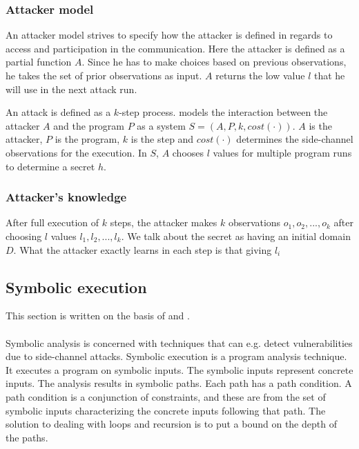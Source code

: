 \documentclass[11pt,a4paper,notitlepage]{article}
\begin{document}
\subsubsection{Attacker model}

An attacker model strives to specify how the attacker is defined in regards to access and participation in the communication. Here the attacker is defined as a partial function $A$. Since he has to make choices based on previous observations, he takes the set of prior observations as input. $A$ returns the low value $l$ that he will use in the next attack run. 

An attack is defined as a $k$-step process. \cite{phan2017synthesis} models the interaction between the attacker $A$ and the program $P$ as a system $S = (A,P,k,cost(\cdot))$. $A$ is the attacker, $P$ is the program, $k$ is the step and $cost(\cdot)$ determines the side-channel observations for the execution. In $S$, $A$ chooses $l$ values for multiple program runs to determine a secret $h$. 

\subsubsection{Attacker's knowledge}

After full execution of $k$ steps, the attacker makes $k$ observations $o_1,o_2,...,o_k$ after choosing $l$ values $l_1,l_2,...,l_k$. We talk about the secret as having an initial domain $D$. What the attacker exactly learns in each step is that giving $l_i$ 

\subsection{Symbolic execution}
\label{sec:symbolicexecution}
This section is written on the basis of \cite{phan2017synthesis} and \cite{malacaria2018symbolic}.
\\\\
Symbolic analysis is concerned with techniques that can e.g. detect vulnerabilities due to side-channel attacks. Symbolic execution is a program analysis technique. It executes a program on symbolic inputs. The symbolic inputs represent concrete inputs. The analysis results in symbolic paths. Each path has a path condition. A path condition is a conjunction of constraints, and these are from the set of symbolic inputs characterizing the concrete inputs following that path. The solution to dealing with loops and recursion is to put a bound on the depth of the paths.  
\end{document}
